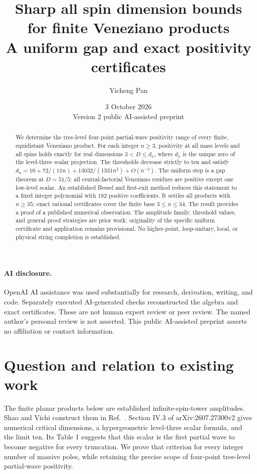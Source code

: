 \documentclass[11pt,a4paper]{article}
\title{Sharp all spin dimension bounds for finite Veneziano products\\[5pt]\large A uniform gap and exact positivity certificates}
\author{Yicheng Pan}
\date{3 October 2026\\[3pt]\small Version 2 public AI-assisted preprint}
\theoremstyle{remark}\newtheorem{remark}[theorem]{Remark}
\begin{document}
\maketitle
\begin{abstract}
We determine the tree-level four-point partial-wave positivity range of every finite, equidistant Veneziano product. For each integer $n\geq3$, positivity at all mass levels and all spins holds exactly for real dimensions $3<D\leq d_n$, where $d_n$ is the unique zero of the level-three scalar projection. The thresholds decrease strictly to ten and satisfy $d_n=10+72/(11n)+13032/(1331n^2)+O(n^{-3})$. The uniform step is a gap theorem at $D=51/5$: all central-factorial Veneziano residues are positive except one low-level scalar. An established Bessel and first-exit method reduces this statement to a fixed integer polynomial with 182 positive coefficients. It settles all products with $n\geq35$; exact rational certificates cover the finite base $3\leq n\leq34$. The result provides a proof of a published numerical observation. The amplitude family, threshold values, and general proof strategies are prior work; originality of the specific uniform certificate and application remains provisional. No higher-point, loop-unitary, local, or physical string completion is established.
\end{abstract}
\paragraph{AI disclosure.} OpenAI AI assistance was used substantially for research, derivation, writing, and code. Separately executed AI-generated checks reconstructed the algebra and exact certificates. These are not human expert review or peer review. The named author's personal review is not asserted. This public AI-assisted preprint asserts no affiliation or contact information.

\section{Question and relation to existing work}
The finite planar products below are established infinite-spin-tower amplitudes. Shao and Vichi construct them in Ref.~\cite{Shao}. Section IV.3 of arXiv:2607.27300v2 gives numerical critical dimensions, a hypergeometric level-three scalar formula, and the limit ten. Its Table 1 suggests that this scalar is the first partial wave to become negative for every truncation. We prove that criterion for every integer number of massive poles, while retaining the precise scope of four-point tree-level partial-wave positivity.
\end{document}
